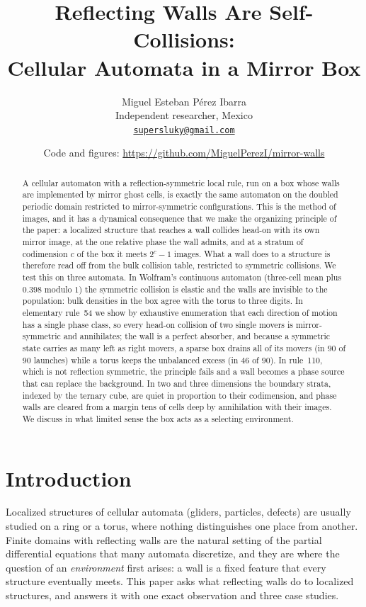 \documentclass[11pt,a4paper]{article}
\title{Reflecting Walls Are Self-Collisions:\\
  Cellular Automata in a Mirror Box}
\author{Miguel Esteban P\'erez Ibarra\\[2pt]
  \small Independent researcher, Mexico\\
  \small \href{mailto:supersluky@gmail.com}{\texttt{supersluky@gmail.com}}}
\date{\small Code and figures: \url{https://github.com/MiguelPerezI/mirror-walls}}
\theoremstyle{definition}
\theoremstyle{remark}
\begin{document}
\maketitle

\begin{abstract}
A cellular automaton with a reflection-symmetric local rule, run on a
box whose walls are implemented by mirror ghost cells, is exactly the
same automaton on the doubled periodic domain restricted to
mirror-symmetric configurations. This is the method of images, and it
has a dynamical consequence that we make the organizing principle of the
paper: a localized structure that reaches a wall collides head-on with
its own mirror image, at the one relative phase the wall admits, and at
a stratum of codimension $c$ of the box it meets $2^c-1$ images. What a
wall does to a structure is therefore read off from the bulk collision
table, restricted to symmetric collisions. We test this on three
automata. In Wolfram's continuous automaton (three-cell mean plus $0.398$
modulo $1$) the symmetric collision is elastic and the walls are
invisible to the population: bulk densities in the box agree with the
torus to three digits. In elementary rule~54 we show by exhaustive
enumeration that each direction of motion has a single phase class, so
every head-on collision of two single movers is mirror-symmetric and
annihilates; the wall is a perfect absorber, and because a symmetric
state carries as many left as right movers, a sparse box drains all of
its movers (in $90$ of $90$ launches) while a torus keeps the unbalanced
excess (in $46$ of $90$). In rule~110, which is not reflection
symmetric, the principle fails and a wall becomes a phase source that
can replace the background. In two and three dimensions the boundary
strata, indexed by the ternary cube, are quiet in proportion to their
codimension, and phase walls are cleared from a margin tens of cells deep
by annihilation with their images. We discuss in what limited sense the
box acts as a selecting environment.
\end{abstract}

\section{Introduction}\label{sec:intro}

Localized structures of cellular automata (gliders, particles, defects)
are usually studied on a ring or a torus, where nothing distinguishes
one place from another. Finite domains with reflecting walls are the
natural setting of the partial differential equations that many
automata discretize, and they are where the question of an
\emph{environment} first arises: a wall is a fixed feature that every
structure eventually meets. This paper asks what reflecting walls do to
localized structures, and answers it with one exact observation and
three case studies.
\end{document}
